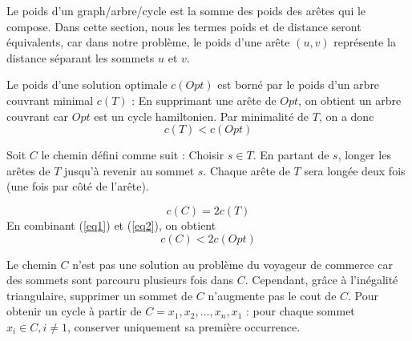 \documentclass[a4paper,11pt]{article}
\begin{document}
Le poids d'un graph/arbre/cycle est la somme des poids des arêtes qui le compose.
Dans cette section, nous les termes poids et de distance seront équivalents, car dans notre problème, le poids d'une arête $(u,v)$ représente la distance séparant les sommets $u$ et $v$.

Le poids d'une solution optimale $c(Opt)$ est borné par le poids d'un arbre couvrant minimal $c(T)$ :
En supprimant une arête de $Opt$, on obtient un arbre couvrant car $Opt$ est un cycle hamiltonien. Par minimalité de $T$, on a donc \begin{equation}
c(T) < c(Opt)
\label{eq1}
\end{equation}




Soit $C$ le chemin défini comme suit :
Choisir $s \in T$. En partant de $s$, longer les arêtes de $T$ jusqu'à revenir au sommet $s$. Chaque arête de $T$ sera longée deux fois (une fois par côté de l'arête).



\begin{equation}
c(C) = 2c(T)
\label{eq2}
\end{equation}
En combinant (\ref{eq1}) et (\ref{eq2}), on obtient
\begin{equation}
c(C) < 2c(Opt)
\label{eq3}
\end{equation}

Le chemin $C$ n'est pas une solution au problème du voyageur de commerce car des sommets sont parcouru plusieurs fois dans $C$. Cependant, grâce à l'inégalité triangulaire, supprimer un sommet de $C$ n'augmente pas le cout de $C$.
Pour obtenir un cycle à partir de $C = x_1, x_2, \ldots, x_n, x_1$ :
pour chaque sommet $x_i \in C, i\neq1$, conserver uniquement sa première occurrence.
\end{document}
